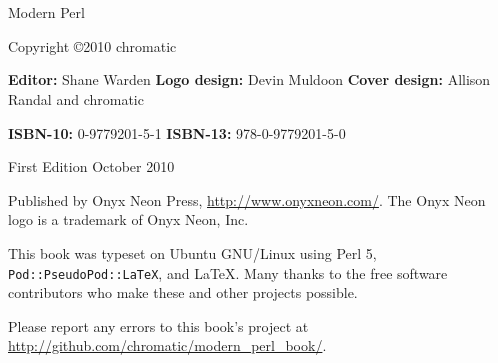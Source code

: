 \chapter*{}
\thispagestyle{empty}

\huge{Modern Perl}
\newline
\newline
\newline
\normalsize

Copyright \copyright 2010 chromatic

\textbf{Editor:} Shane Warden\newline
\textbf{Logo design:} Devin Muldoon\newline
\textbf{Cover design:} Allison Randal and chromatic

\textbf{ISBN-10:} 0-9779201-5-1\newline
\textbf{ISBN-13:} 978-0-9779201-5-0

First Edition October 2010

Published by Onyx Neon Press, \url{http://www.onyxneon.com/}.
The Onyx Neon logo is a trademark of Onyx Neon, Inc.

This book was typeset on Ubuntu GNU/Linux using Perl 5,
\textnhtt{Pod::PseudoPod::LaTeX}, and LaTeX. Many thanks to the free software
contributors who make these and other projects possible.

Please report any errors to this book's project at \url{http://github.com/chromatic/modern_perl_book/}.
